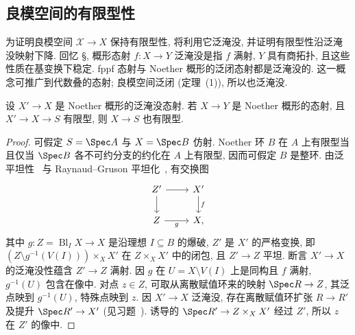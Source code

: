 \subsection{良模空间的有限型性}\label{src:7.5.5-subsection}
为证明良模空间 $\mathcal X\to X$ 保持有限型性, 将利用它泛淹没, 并证明有限型性沿泛淹没映射下降. 回忆 \S{}, 概形态射 $f:X\to Y$ 泛淹没是指 $f$ 满射, $Y$ 具有商拓扑, 且这些性质在基变换下稳定. fppf 态射与 Noether 概形的泛闭态射都是泛淹没的. 这一概念可推广到代数叠的态射; 良模空间泛闭 (定理~(1)), 所以也泛淹没.
\begin{proposition}[有限型性的泛淹没下降]\label{src:7.5.28}
设 $X'\to X$ 是 Noether 概形的泛淹没态射. 若 $X\to Y$ 是 Noether 概形的态射, 且 $X'\to X\to S$ 有限型, 则 $X\to S$ 也有限型.
\end{proposition}
\begin{proof}
可假定 $S=\Spec A$ 与 $X=\Spec B$ 仿射. Noether 环 $B$ 在 $A$ 上有限型当且仅当 $\Spec B$ 各不可约分支的约化在 $A$ 上有限型, 因而可假定 $B$ 是整环. 由泛平坦性~ 与 Raynaud--Gruson 平坦化~, 有交换图
\begin{align*}
\begin{tikzcd}[ampersand replacement=\&]
Z'\arrow[r]\arrow[d]\&X'\arrow[d,"{f}"]\\
Z\arrow[r,"{g}"']\&X,
\end{tikzcd}
\end{align*}
其中 $g:Z=\operatorname{Bl}_IX\to X$ 是沿理想 $I\subseteq B$ 的爆破, $Z'$ 是 $X'$ 的严格变换, 即 $(Z\setminus g^{-1}(V(I)))\times_XX'$ 在 $Z\times_XX'$ 中的闭包, 且 $Z'\to Z$ 平坦. 断言 $X'\to X$ 的泛淹没性蕴含 $Z'\to Z$ 满射. 因 $g$ 在 $U=X\setminus V(I)$ 上是同构且 $f$ 满射, $g^{-1}(U)$ 包含在像中. 对点 $z\in Z$, 可取从离散赋值环来的映射 $\Spec R\to Z$, 其泛点映到 $g^{-1}(U)$, 特殊点映到 $z$. 因 $X'\to X$ 泛淹没, 存在离散赋值环扩张 $R\to R'$ 及提升 $\Spec R'\to X'$ (见习题~). 诱导的 $\Spec R'\to Z\times_XX'$ 经过 $Z'$, 所以 $z$ 在 $Z'$ 的像中.


\end{proof}
